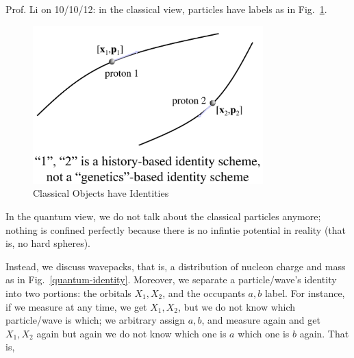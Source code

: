 \documentclass{school-22.101-notes}
\date{October 14, 2011}
\begin{document}
\maketitle

Prof. Li on 10/10/12: in the classical view, particles have labels as in Fig.~\ref{classical-identity}. 

\begin{figure}[ht]
  \centering
  \includegraphics[width=3.5in]{images/ns/classical-identity.png}
  \caption{Classical Objects have Identities} \label{classical-identity}
\end{figure}

In the quantum view, we do not talk about the classical particles anymore; nothing is confined perfectly because there is no infintie potential in reality (that is, no hard spheres). 

Instead, we discuss wavepacks, that is, a distribution of nucleon charge and mass as in Fig.~\ref{quantum-identity}. Moreover, we separate a particle/wave's identity into two portions: the orbitals $X_1, X_2$, and the occupants $a,b$ label. For instance, if we measure at any time, we get $X_1, X_2$, but we do not know which particle/wave is which; we arbitrary assign $a,b$, and measure again and get $X_1, X_2$ again but again we do not know which one is $a$ which one is $b$ again. That is, 
\end{document}
